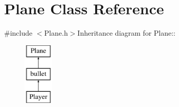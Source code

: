 \hypertarget{classPlane}{
\section{Plane Class Reference}
\label{classPlane}
}


{\ttfamily \#include $<$Plane.h$>$}Inheritance diagram for Plane::\begin{figure}[H]
\begin{center}
\leavevmode
\includegraphics[height=3cm]{classPlane}
\end{center}
\end{figure}
